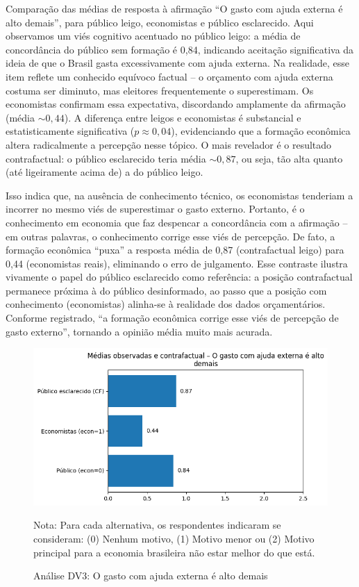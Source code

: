 Comparação das médias de resposta à afirmação “O gasto com ajuda externa é alto demais”, para público leigo, economistas e público esclarecido. Aqui observamos um viés cognitivo acentuado no público leigo: a média de concordância do público sem formação é 0,84, indicando aceitação significativa da ideia de que o Brasil gasta excessivamente com ajuda externa. Na realidade, esse item reflete um conhecido equívoco factual – o orçamento com ajuda externa costuma ser diminuto, mas eleitores frequentemente o superestimam. Os economistas confirmam essa expectativa, discordando amplamente da afirmação (média $\sim 0{,}44$). A diferença entre leigos e economistas é substancial e estatisticamente significativa ($p \approx 0{,}04$), evidenciando que a formação econômica altera radicalmente a percepção nesse tópico. O mais revelador é o resultado contrafactual: o público esclarecido teria média $\sim 0{,}87$, ou seja, tão alta quanto (até ligeiramente acima de) a do público leigo. 

Isso indica que, na ausência de conhecimento técnico, os economistas tenderiam a incorrer no mesmo viés de superestimar o gasto externo. Portanto, é o conhecimento em economia que faz despencar a concordância com a afirmação – em outras palavras, o conhecimento corrige esse viés de percepção. De fato, a formação econômica “puxa” a resposta média de 0,87 (contrafactual leigo) para 0,44 (economistas reais), eliminando o erro de julgamento. Esse contraste ilustra vivamente o papel do público esclarecido como referência: a posição contrafactual permanece próxima à do público desinformado, ao passo que a posição com conhecimento (economistas) alinha-se à realidade dos dados orçamentários. Conforme registrado, “a formação econômica corrige esse viés de percepção de gasto externo”, tornando a opinião média muito mais acurada.

\begin{figure}[htbp]
    \centering
    \includegraphics[width=1\textwidth]{Textuais/analise/imagens/gasto_ajuda_externa.png}
    \caption{Análise DV3: O gasto com ajuda externa é alto demais}
    \smallskip
    Nota: Para cada alternativa, os respondentes indicaram se consideram: (0) Nenhum motivo, (1) Motivo menor ou (2) Motivo principal para a economia brasileira não estar melhor do que está.
    \label{fig:gasto_ajuda_externa}
\end{figure}


